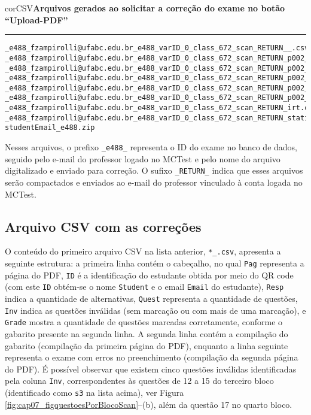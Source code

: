 \begin{myboxCode}{corCSV}{\textbf{Arquivos gerados ao solicitar a correção do exame no botão ``Upload-PDF''}}\vspace{3mm}
\hrule
\begin{verbatim}
_e488_fzampirolli@ufabc.edu.br_e488_varID_0_class_672_scan_RETURN__.csv
_e488_fzampirolli@ufabc.edu.br_e488_varID_0_class_672_scan_RETURN_p002_s3_q002.png
_e488_fzampirolli@ufabc.edu.br_e488_varID_0_class_672_scan_RETURN_p002_s3_q003.png
_e488_fzampirolli@ufabc.edu.br_e488_varID_0_class_672_scan_RETURN_p002_s3_q004.png
_e488_fzampirolli@ufabc.edu.br_e488_varID_0_class_672_scan_RETURN_p002_s3_q005.png
_e488_fzampirolli@ufabc.edu.br_e488_varID_0_class_672_scan_RETURN_p002_s4_q001_D_OK.png
_e488_fzampirolli@ufabc.edu.br_e488_varID_0_class_672_scan_RETURN_irt.csv
_e488_fzampirolli@ufabc.edu.br_e488_varID_0_class_672_scan_RETURN_statistics.csv
studentEmail_e488.zip
\end{verbatim}
\end{myboxCode}

Nesses arquivos, o prefixo \verb|_e488_| representa o ID do exame no banco de dados, seguido pelo e-mail do professor logado no MCTest e pelo nome do arquivo digitalizado e enviado para correção. O sufixo \verb|_RETURN_| indica que esses arquivos serão compactados e enviados ao e-mail do professor vinculado à conta logada no MCTest. 

\subsection{Arquivo CSV com as correções}\label{sec:CSVcorrecoesQR}

O conteúdo do primeiro arquivo CSV na lista anterior, \verb|*_.csv|, apresenta a seguinte estrutura: a primeira linha contém o cabeçalho, no qual \verb|Pag| representa a página do PDF, \verb|ID| é a identificação do estudante obtida por meio do QR code (com este \verb|ID| obtém-se o nome \verb|Student| e o email \verb|Email| do estudante), \verb|Resp| indica a quantidade de alternativas, \verb|Quest| representa a quantidade de questões, \verb|Inv| indica as questões inválidas (sem marcação ou com mais de uma marcação), e \verb|Grade| mostra a quantidade de questões marcadas corretamente, conforme o gabarito presente na segunda linha. A segunda linha contém a compilação do gabarito (compilação da primeira página do PDF), enquanto a linha seguinte representa o exame com erros no preenchimento (compilação da segunda página do PDF). É possível observar que existem cinco questões inválidas identificadas pela coluna \verb|Inv|, correspondentes às questões de 12 a 15 do terceiro bloco (identificado como \verb|s3| na lista acima), ver Figura \ref{fig:cap07_figquestoesPorBlocoScan}--(b), além da questão 17 no quarto bloco. 

